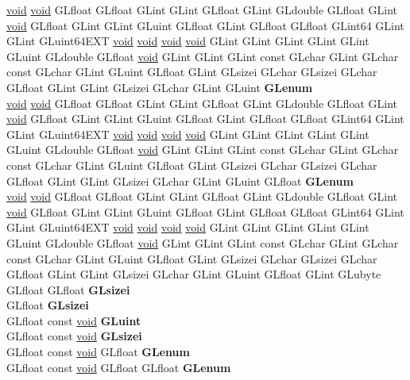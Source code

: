 \begin{DoxyCompactItemize}
\begin{tabbing}
\>\hyperlink{interfacevoid}{void} \hyperlink{interfacevoid}{void} GLfloat GLfloat GLint GLint GLfloat GLint GLdouble GLfloat GLint \hyperlink{interfacevoid}{void} GLfloat GLint GLint GLuint GLfloat GLint GLfloat GLfloat GLint64 GLint GLint GLuint64EXT \hyperlink{interfacevoid}{void} \hyperlink{interfacevoid}{void} \hyperlink{interfacevoid}{void} \hyperlink{interfacevoid}{void} GLint GLint GLint GLint GLint GLuint GLdouble GLfloat \hyperlink{interfacevoid}{void} GLint GLint GLint const GLchar GLint GLchar const GLchar GLint GLuint GLfloat GLint GLsizei GLchar GLsizei GLchar GLfloat GLint GLint GLsizei GLchar GLint GLuint {\bfseries GLenum}\\
\>\hyperlink{interfacevoid}{void} \hyperlink{interfacevoid}{void} GLfloat GLfloat GLint GLint GLfloat GLint GLdouble GLfloat GLint \hyperlink{interfacevoid}{void} GLfloat GLint GLint GLuint GLfloat GLint GLfloat GLfloat GLint64 GLint GLint GLuint64EXT \hyperlink{interfacevoid}{void} \hyperlink{interfacevoid}{void} \hyperlink{interfacevoid}{void} \hyperlink{interfacevoid}{void} GLint GLint GLint GLint GLint GLuint GLdouble GLfloat \hyperlink{interfacevoid}{void} GLint GLint GLint const GLchar GLint GLchar const GLchar GLint GLuint GLfloat GLint GLsizei GLchar GLsizei GLchar GLfloat GLint GLint GLsizei GLchar GLint GLuint GLfloat {\bfseries GLenum}\\
\>\hyperlink{interfacevoid}{void} \hyperlink{interfacevoid}{void} GLfloat GLfloat GLint GLint GLfloat GLint GLdouble GLfloat GLint \hyperlink{interfacevoid}{void} GLfloat GLint GLint GLuint GLfloat GLint GLfloat GLfloat GLint64 GLint GLint GLuint64EXT \hyperlink{interfacevoid}{void} \hyperlink{interfacevoid}{void} \hyperlink{interfacevoid}{void} \hyperlink{interfacevoid}{void} GLint GLint GLint GLint GLint GLuint GLdouble GLfloat \hyperlink{interfacevoid}{void} GLint GLint GLint const GLchar GLint GLchar const GLchar GLint GLuint GLfloat GLint GLsizei GLchar GLsizei GLchar GLfloat GLint GLint GLsizei GLchar GLint GLuint GLfloat GLint GLubyte GLfloat GLfloat {\bfseries GLsizei}\\
\>GLfloat {\bfseries GLsizei}\\
\>GLfloat const \hyperlink{interfacevoid}{void} {\bfseries GLuint}\\
\>GLfloat const \hyperlink{interfacevoid}{void} {\bfseries GLsizei}\\
\>GLfloat const \hyperlink{interfacevoid}{void} GLfloat {\bfseries GLenum}\\
\>GLfloat const \hyperlink{interfacevoid}{void} GLfloat GLfloat {\bfseries GLenum}\\

\end{tabbing}
\end{DoxyCompactItemize}
